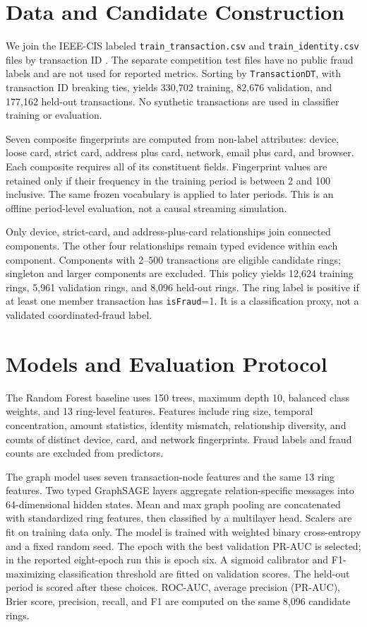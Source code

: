 \documentclass[conference]{IEEEtran}
\begin{document}
\section{Data and Candidate Construction}
We join the IEEE-CIS labeled \texttt{train\_transaction.csv} and \texttt{train\_identity.csv} files by transaction ID \cite{ieeecis}. The separate competition test files have no public fraud labels and are not used for reported metrics. Sorting by \texttt{TransactionDT}, with transaction ID breaking ties, yields 330,702 training, 82,676 validation, and 177,162 held-out transactions. No synthetic transactions are used in classifier training or evaluation.

Seven composite fingerprints are computed from non-label attributes: device, loose card, strict card, address plus card, network, email plus card, and browser. Each composite requires all of its constituent fields. Fingerprint values are retained only if their frequency in the training period is between 2 and 100 inclusive. The same frozen vocabulary is applied to later periods. This is an offline period-level evaluation, not a causal streaming simulation.

Only device, strict-card, and address-plus-card relationships join connected components. The other four relationships remain typed evidence within each component. Components with 2--500 transactions are eligible candidate rings; singleton and larger components are excluded. This policy yields 12,624 training rings, 5,961 validation rings, and 8,096 held-out rings. The ring label is positive if at least one member transaction has \texttt{isFraud}=1. It is a classification proxy, not a validated coordinated-fraud label.

\section{Models and Evaluation Protocol}
The Random Forest baseline uses 150 trees, maximum depth 10, balanced class weights, and 13 ring-level features. Features include ring size, temporal concentration, amount statistics, identity mismatch, relationship diversity, and counts of distinct device, card, and network fingerprints. Fraud labels and fraud counts are excluded from predictors.

The graph model uses seven transaction-node features and the same 13 ring features. Two typed GraphSAGE layers aggregate relation-specific messages into 64-dimensional hidden states. Mean and max graph pooling are concatenated with standardized ring features, then classified by a multilayer head. Scalers are fit on training data only. The model is trained with weighted binary cross-entropy and a fixed random seed. The epoch with the best validation PR-AUC is selected; in the reported eight-epoch run this is epoch six. A sigmoid calibrator and F1-maximizing classification threshold are fitted on validation scores. The held-out period is scored after these choices. ROC-AUC, average precision (PR-AUC), Brier score, precision, recall, and F1 are computed on the same 8,096 candidate rings.
\end{document}
